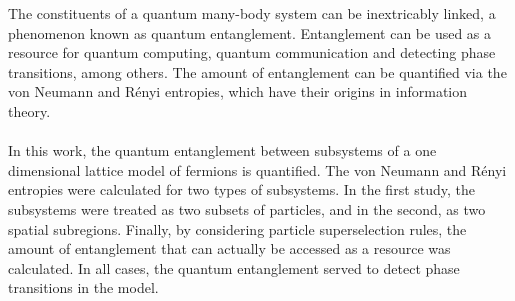 \begin{singlespace}
The constituents of a quantum many-body system can be inextricably linked, a phenomenon known as quantum entanglement. Entanglement can be used as a resource for quantum computing, quantum communication and detecting phase transitions, among others. The amount of entanglement can be quantified via the von Neumann and R\'enyi entropies, which have their origins in information theory.
\\
\\
In this work, the quantum entanglement between subsystems of a one dimensional lattice model of fermions is quantified. The von Neumann and R\'enyi entropies were calculated for two types of subsystems. In the first study, the subsystems were treated as two subsets of particles, and in the second, as two spatial subregions. Finally, by considering particle superselection rules, the amount of entanglement that can actually be accessed as a resource was calculated. In all cases, the quantum entanglement served to detect phase transitions in the model. 
\end{singlespace}